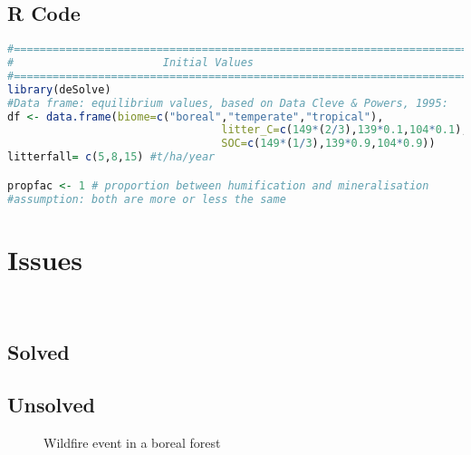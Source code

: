 \documentclass[10pt, a4paper]{article}
\begin{document}
\subsection{R Code}
\begin{lstlisting}[language=R]
#=============================================================================
#                       Initial Values
#=============================================================================
library(deSolve)
#Data frame: equilibrium values, based on Data Cleve & Powers, 1995:
df <- data.frame(biome=c("boreal","temperate","tropical"),
							 	 litter_C=c(149*(2/3),139*0.1,104*0.1),
								 SOC=c(149*(1/3),139*0.9,104*0.9))
litterfall= c(5,8,15) #t/ha/year

propfac <- 1 # proportion between humification and mineralisation  
#assumption: both are more or less the same
\end{lstlisting}


\section{Issues}
\
\subsection{Solved}
\subsection{Unsolved}


\begin{figure}[!htbp]
	\centering
	\caption{Wildfire event in a boreal forest}
\end{figure}
\end{document}
